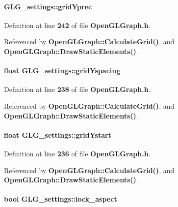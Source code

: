 \paragraph[{grid\+Yprec}]{ G\+L\+G\+\_\+settings\+::grid\+Yprec}\label{structGLG__settings_a6919147f0e6c9c4272740e46995e6f1d}


Definition at line {\bf 242} of file {\bf Open\+G\+L\+Graph.\+h}.



Referenced by {\bf Open\+G\+L\+Graph\+::\+Calculate\+Grid()}, and {\bf Open\+G\+L\+Graph\+::\+Draw\+Static\+Elements()}.

\paragraph[{grid\+Yspacing}]{\setlength{\rightskip}{0pt plus 5cm}float G\+L\+G\+\_\+settings\+::grid\+Yspacing}\label{structGLG__settings_af3c74ca1a8b616de5fe5454145556e06}


Definition at line {\bf 238} of file {\bf Open\+G\+L\+Graph.\+h}.



Referenced by {\bf Open\+G\+L\+Graph\+::\+Calculate\+Grid()}, and {\bf Open\+G\+L\+Graph\+::\+Draw\+Static\+Elements()}.

\paragraph[{grid\+Ystart}]{\setlength{\rightskip}{0pt plus 5cm}float G\+L\+G\+\_\+settings\+::grid\+Ystart}\label{structGLG__settings_ab526e17c1b3188445579ffe2cc43e876}


Definition at line {\bf 236} of file {\bf Open\+G\+L\+Graph.\+h}.



Referenced by {\bf Open\+G\+L\+Graph\+::\+Calculate\+Grid()}, and {\bf Open\+G\+L\+Graph\+::\+Draw\+Static\+Elements()}.

\paragraph[{lock\+\_\+aspect}]{\setlength{\rightskip}{0pt plus 5cm}bool G\+L\+G\+\_\+settings\+::lock\+\_\+aspect}\label{structGLG__settings_ae3896fb8ca509e1cd0278a5c733ccac4}


